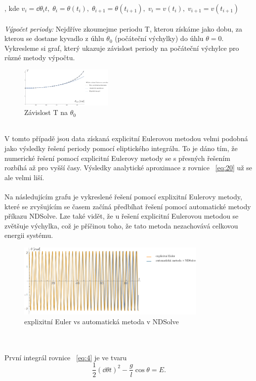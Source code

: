 \documentclass[reqno, a4paper]{amsart}
\begin{document}
, kde $ v_{i}=\dd{\theta_{i}}{t},\; \theta_{i}=\theta(t_{i}),\;\theta_{i+1}=\theta(t_{i+1}),\;v_{i}=v(t_{i}),\;v_{i+1}=v(t_{i+1})$
\\
\\
\textit{Výpočet periody:} Nejdříve zkoumejme periodu T, kterou získáme jako dobu, za kterou se dostane kyvadlo z úhlu $\theta_{0}$ (počáteční výchylky) do úhlu $\theta=0$. Vykresleme si graf, který ukazuje závislost periody na počáteční výchylce pro různé metody výpočtu.
\begin{figure}[h]
	\centering
	\includegraphics[width=0.4\textwidth]{graf1}
	\caption*{Závislost T na $\theta_{0}$}  
\end{figure}
\\
V tomto případě jsou data získaná explicitní Eulerovou metodou velmi podobná jako výsledky řešení periody pomocí eliptického integrálu. To je dáno tím, že numerické řešení pomocí explicitní Eulerovy metody se s přesných řešením rozbíhá až pro vyšší časy. Výsledky analytické aproximace z rovnice ~\eqref{eq:20} už se ale velmi liší.
\\
\\
Na následujícím grafu je vykreslené řešení pomocí explixitní Eulerovy metody, které se zvyšujícím se časem začíná předbíhat řešení pomocí automatické metody příkazu NDSolve. Lze také vidět, že u řešení explicitní Eulerovou metodou se zvětšuje výchylka, což je příčinou toho, že tato metoda nezachovává celkovou energii systému.
\begin{figure}[h]
	\centering
	\includegraphics[width=0.82\textwidth]{vs}
	\caption*{explixitní Euler vs automatická metoda v NDSolve}  
\end{figure}
\\
\\
První integrál rovnice ~\eqref{eq:4} je ve tvaru
\begin{equation}
	\frac{1}{2}
	\left(
	\dd{\theta}{t}
	\right)^2
	-
	\frac{g}{l}
	\cos \theta
	=
	E
	.
\end{equation}
\end{document}
